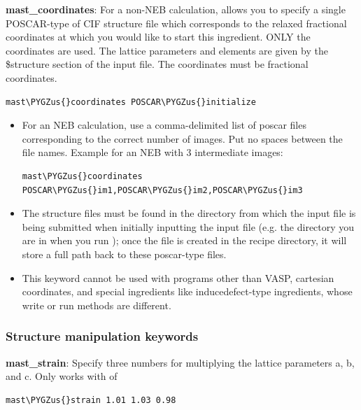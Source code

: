 \documentclass[letterpaper,10pt,english]{sphinxmanual}
\def\PYGZus{\char`\_}
\begin{document}
\textbf{mast\_coordinates}: For a non-NEB calculation, allows you to specify a single POSCAR-type of CIF structure file which corresponds to the relaxed fractional coordinates at which you would like to start this ingredient. ONLY the coordinates are used. The lattice parameters and elements are given by the \$structure section of the input file. The coordinates must be fractional coordinates.

\begin{Verbatim}[commandchars=\\\{\}]
mast\PYGZus{}coordinates POSCAR\PYGZus{}initialize
\end{Verbatim}
\begin{itemize}
\item {} 
For an NEB calculation, use a comma-delimited list of poscar files corresponding to the correct number of images. Put no spaces between the file names. Example for an NEB with 3 intermediate images:

\begin{Verbatim}[commandchars=\\\{\}]
mast\PYGZus{}coordinates POSCAR\PYGZus{}im1,POSCAR\PYGZus{}im2,POSCAR\PYGZus{}im3
\end{Verbatim}

\item {} 
The structure files must be found in the directory from which the input file is being submitted when initially inputting the input file (e.g. the directory you are in when you run ); once the  file is created in the recipe directory, it will store a full path back to these poscar-type files.

\item {} 
This keyword cannot be used with programs other than VASP, cartesian coordinates, and special ingredients like inducedefect-type ingredients, whose write or run methods are different.

\end{itemize}


\subsubsection{Structure manipulation keywords}
\label{3_1_2_ingredients:structure-manipulation-keywords}
\textbf{mast\_strain}: Specify three numbers for multiplying the lattice parameters a, b, and c. Only works with  of 

\begin{Verbatim}[commandchars=\\\{\}]
mast\PYGZus{}strain 1.01 1.03 0.98
\end{Verbatim}
\end{document}
